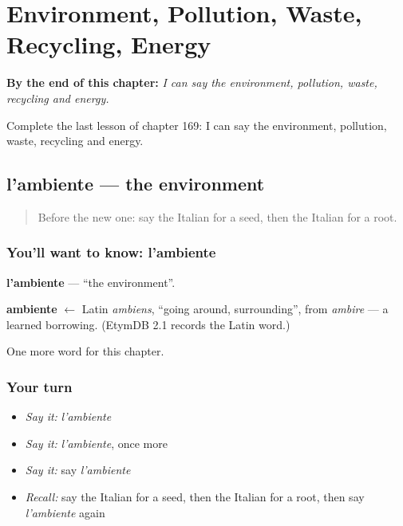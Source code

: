 
\chapter{Environment, Pollution, Waste, Recycling, Energy}
\label{ch:it-environment-pollution-waste-recycling-energy}

\begin{chapteropening}
\textbf{By the end of this chapter:} \emph{I can say the environment, pollution, waste, recycling and energy.}

Complete the last lesson of chapter 169: I can say the environment, pollution, waste, recycling and energy.
\end{chapteropening}

\section[l'ambiente]{l'ambiente — the environment}

\label{lesson:IT-C169-ambiente}



\begin{quote}
Before the new one: say the Italian for a seed, then the Italian for a root.
\end{quote}

\subsection*{You'll want to know: l'ambiente}
\textbf{l'ambiente} — \textquotedblleft{}the environment\textquotedblright{}.

\begin{cousinweb}
\textbf{ambiente} $\leftarrow$ Latin \emph{ambiens}, \textquotedblleft{}going around, surrounding\textquotedblright{}, from \emph{ambire} — a learned borrowing. (EtymDB 2.1 records the Latin word.)
\end{cousinweb}

\begin{grammarlens}[title={What you've built}]
One more word for this chapter.
\end{grammarlens}

\subsection*{Your turn}
\begin{itemize}
\raggedright
  \item \emph{Say it:} \emph{l'ambiente}
  \item \emph{Say it:} \emph{l'ambiente}, once more
  \item \emph{Say it:} say \emph{l'ambiente}
  \item \emph{Recall:} say the Italian for a seed, then the Italian for a root, then say \emph{l'ambiente} again
\end{itemize}

